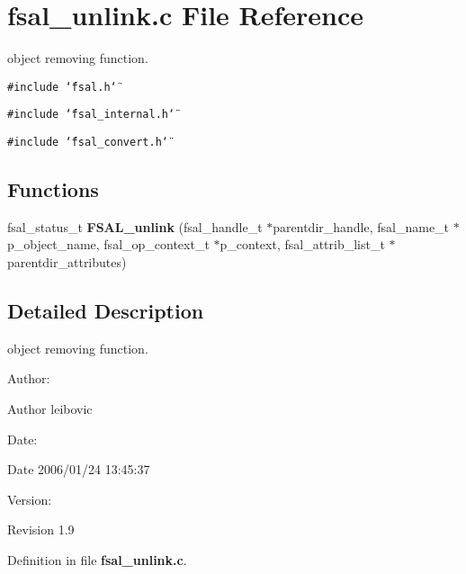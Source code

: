 \section{fsal\_\-unlink.c File Reference}
\label{fsal__unlink_8c}
object removing function.  


{\tt \#include \char`\"{}fsal.h\char`\"{}}\par
{\tt \#include \char`\"{}fsal\_\-internal.h\char`\"{}}\par
{\tt \#include \char`\"{}fsal\_\-convert.h\char`\"{}}\par
\subsection*{Functions}
\begin{CompactItemize}
\item 
fsal\_\-status\_\-t {\bf FSAL\_\-unlink} (fsal\_\-handle\_\-t $\ast$parentdir\_\-handle, fsal\_\-name\_\-t $\ast$p\_\-object\_\-name, fsal\_\-op\_\-context\_\-t $\ast$p\_\-context, fsal\_\-attrib\_\-list\_\-t $\ast$parentdir\_\-attributes)
\end{CompactItemize}


\subsection{Detailed Description}
object removing function. 

\begin{Desc}
\item[Author:]\end{Desc}
\begin{Desc}
\item[Author]leibovic \end{Desc}
\begin{Desc}
\item[Date:]\end{Desc}
\begin{Desc}
\item[Date]2006/01/24 13:45:37 \end{Desc}
\begin{Desc}
\item[Version:]\end{Desc}
\begin{Desc}
\item[Revision]1.9 \end{Desc}


Definition in file {\bf fsal\_\-unlink.c}.

